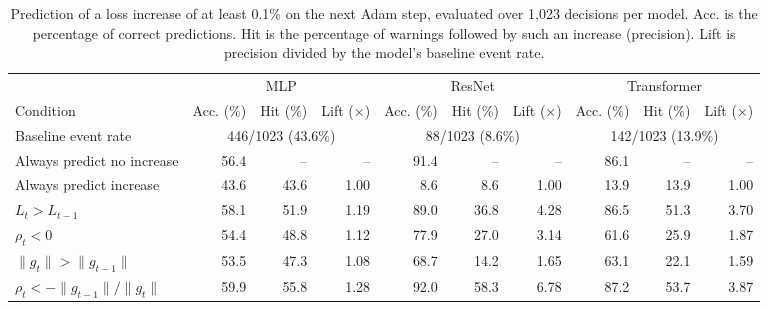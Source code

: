 \begin{table}[!t]
\centering\small
\caption{Prediction of a loss increase of at least 0.1\% on the next Adam step, evaluated over 1,023 decisions per model. Acc. is the percentage of correct predictions. Hit is the percentage of warnings followed by such an increase (precision). Lift is precision divided by the model's baseline event rate.}
\label{tab:severity}
\setlength{\tabcolsep}{4pt}
\begin{tabular}{@{}lrrrrrrrrr@{}}
\toprule
& \multicolumn{3}{c}{MLP} & \multicolumn{3}{c}{ResNet} & \multicolumn{3}{c}{Transformer} \\
Condition & Acc. (\%) & Hit (\%) & Lift ($\times$) & Acc. (\%) & Hit (\%) & Lift ($\times$) & Acc. (\%) & Hit (\%) & Lift ($\times$) \\
\midrule
Baseline event rate & \multicolumn{3}{c}{446/1023 (43.6\%)} & \multicolumn{3}{c}{88/1023 (8.6\%)} & \multicolumn{3}{c}{142/1023 (13.9\%)} \\
\midrule
Always predict no increase & 56.4 & -- & -- & 91.4 & -- & -- & 86.1 & -- & -- \\
Always predict increase & 43.6 & 43.6 & 1.00 & 8.6 & 8.6 & 1.00 & 13.9 & 13.9 & 1.00 \\
$L_t>L_{t-1}$ & 58.1 & 51.9 & 1.19 & 89.0 & 36.8 & 4.28 & 86.5 & 51.3 & 3.70 \\
$\rho_t<0$ & 54.4 & 48.8 & 1.12 & 77.9 & 27.0 & 3.14 & 61.6 & 25.9 & 1.87 \\
$\|g_t\|>\|g_{t-1}\|$ & 53.5 & 47.3 & 1.08 & 68.7 & 14.2 & 1.65 & 63.1 & 22.1 & 1.59 \\
$\rho_t<-\|g_{t-1}\|/\|g_t\|$ & 59.9 & 55.8 & 1.28 & 92.0 & 58.3 & 6.78 & 87.2 & 53.7 & 3.87 \\
\bottomrule
\end{tabular}
\end{table}
